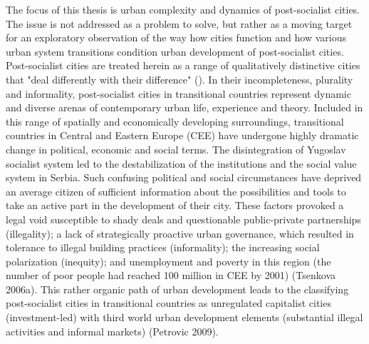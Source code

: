 \documentclass[11pt]{report}
\begin{document}
The focus of this thesis is urban complexity and dynamics of post-socialist cities. The issue is not addressed as a problem to solve, but rather as a moving target for an exploratory observation of the way how cities function and how various urban system transitions condition urban development of post-socialist cities.
\\
Post-socialist cities are treated herein as a range of qualitatively distinctive cities that "deal differently with their difference" (\href{ref}{\citealt{ref}}). In their incompleteness, plurality and informality, post-socialist cities in transitional countries represent dynamic and diverse arenas of contemporary urban life, experience and theory. Included in this range of spatially and economically developing surroundings, transitional countries in Central and Eastern Europe (CEE) have undergone highly dramatic change in political, economic and social terms. The disintegration of Yugoslav socialist system led to the destabilization of the institutions and the social value system in Serbia. Such confusing political and social circumstances have deprived an average citizen of sufficient information about the possibilities and tools to take an active part in the development of their city. These factors provoked a legal void susceptible to shady deals and questionable public-private partnerships (illegality); a lack of strategically proactive urban governance, which resulted in tolerance to illegal building practices (informality); the increasing social polarization (inequity); and unemployment and poverty in this region (the number of poor people had reached 100 million in CEE by 2001) (Tsenkova 2006a). This rather organic path of urban development leads to the classifying post-socialist cities in transitional countries as unregulated capitalist cities (investment-led) with third world urban development elements (substantial illegal activities and informal markets) (Petrovic 2009).
\\
\end{document}
